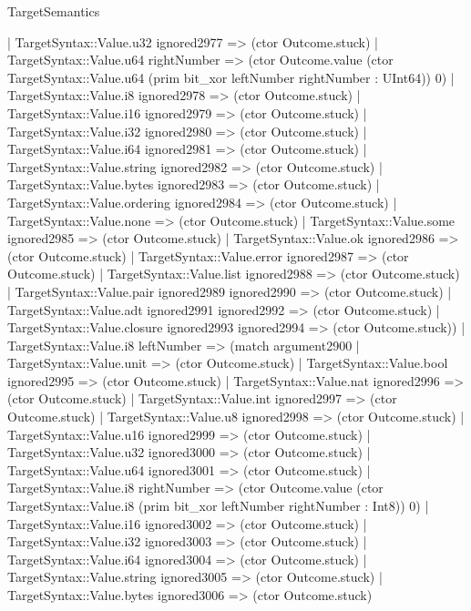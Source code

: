 \begin{lexlean}{TargetSemantics}
\begin{semanticmodule}
{              | TargetSyntax::Value.u32 ignored2977 => (ctor Outcome.stuck)
              | TargetSyntax::Value.u64 rightNumber => (ctor Outcome.value (ctor TargetSyntax::Value.u64 (prim bit_xor leftNumber rightNumber : UInt64)) 0)
              | TargetSyntax::Value.i8 ignored2978 => (ctor Outcome.stuck)
              | TargetSyntax::Value.i16 ignored2979 => (ctor Outcome.stuck)
              | TargetSyntax::Value.i32 ignored2980 => (ctor Outcome.stuck)
              | TargetSyntax::Value.i64 ignored2981 => (ctor Outcome.stuck)
              | TargetSyntax::Value.string ignored2982 => (ctor Outcome.stuck)
              | TargetSyntax::Value.bytes ignored2983 => (ctor Outcome.stuck)
              | TargetSyntax::Value.ordering ignored2984 => (ctor Outcome.stuck)
              | TargetSyntax::Value.none => (ctor Outcome.stuck)
              | TargetSyntax::Value.some ignored2985 => (ctor Outcome.stuck)
              | TargetSyntax::Value.ok ignored2986 => (ctor Outcome.stuck)
              | TargetSyntax::Value.error ignored2987 => (ctor Outcome.stuck)
              | TargetSyntax::Value.list ignored2988 => (ctor Outcome.stuck)
              | TargetSyntax::Value.pair ignored2989 ignored2990 => (ctor Outcome.stuck)
              | TargetSyntax::Value.adt ignored2991 ignored2992 => (ctor Outcome.stuck)
              | TargetSyntax::Value.closure ignored2993 ignored2994 => (ctor Outcome.stuck))
            | TargetSyntax::Value.i8 leftNumber => (match argument2900
              | TargetSyntax::Value.unit => (ctor Outcome.stuck)
              | TargetSyntax::Value.bool ignored2995 => (ctor Outcome.stuck)
              | TargetSyntax::Value.nat ignored2996 => (ctor Outcome.stuck)
              | TargetSyntax::Value.int ignored2997 => (ctor Outcome.stuck)
              | TargetSyntax::Value.u8 ignored2998 => (ctor Outcome.stuck)
              | TargetSyntax::Value.u16 ignored2999 => (ctor Outcome.stuck)
              | TargetSyntax::Value.u32 ignored3000 => (ctor Outcome.stuck)
              | TargetSyntax::Value.u64 ignored3001 => (ctor Outcome.stuck)
              | TargetSyntax::Value.i8 rightNumber => (ctor Outcome.value (ctor TargetSyntax::Value.i8 (prim bit_xor leftNumber rightNumber : Int8)) 0)
              | TargetSyntax::Value.i16 ignored3002 => (ctor Outcome.stuck)
              | TargetSyntax::Value.i32 ignored3003 => (ctor Outcome.stuck)
              | TargetSyntax::Value.i64 ignored3004 => (ctor Outcome.stuck)
              | TargetSyntax::Value.string ignored3005 => (ctor Outcome.stuck)
              | TargetSyntax::Value.bytes ignored3006 => (ctor Outcome.stuck)
}
\end{semanticmodule}
\end{lexlean}
